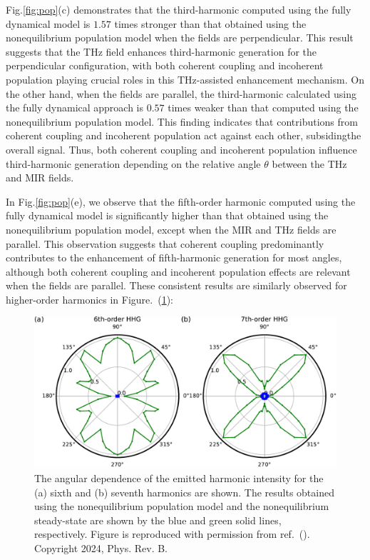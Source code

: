 Fig.\ref{fig:pop}(c) demonstrates that the third-harmonic  computed using the fully dynamical model is $1.57$ times stronger than that obtained using the nonequilibrium population model when the fields are perpendicular. This result suggests that the THz field enhances third-harmonic generation for the perpendicular configuration, with both coherent coupling and incoherent population playing crucial roles in this THz-assisted enhancement mechanism. On the other hand, when the fields are parallel, the third-harmonic  calculated using the fully dynamical approach is $0.57$ times weaker than that computed using the nonequilibrium population model. This finding indicates that contributions from coherent coupling and incoherent population act against each other, subsidingthe overall signal. Thus, both coherent coupling and incoherent population influence third-harmonic generation depending on the relative angle $\theta$ between the THz and MIR fields.

In Fig.\ref{fig:pop}(e), we observe that the fifth-order harmonic  computed using the fully dynamical model is significantly higher than that obtained using the nonequilibrium population model, except when the MIR and THz fields are parallel. This observation suggests that coherent coupling predominantly contributes to the enhancement of fifth-harmonic generation for most angles, although both coherent coupling and incoherent population effects are relevant when the fields are parallel. These consistent results are similarly observed for higher-order harmonics in Figure.~(\ref{fig:SI_pop}):
\begin{figure}[tb]
	\center
	\includegraphics[width=0.8\linewidth]{pic/SI_pop.pdf}
	\caption{\label{fig:SI_pop}
		The angular dependence of the emitted harmonic intensity for the (a) sixth and (b) seventh harmonics are shown. The results obtained using the nonequilibrium population model and the nonequilibrium steady-state are shown by the blue and green solid lines, respectively. Figure is reproduced with permission from ref.~(\cite{PhysRevB.109.045421}). Copyright 2024, Phys. Rev. B.
	}
\end{figure}

